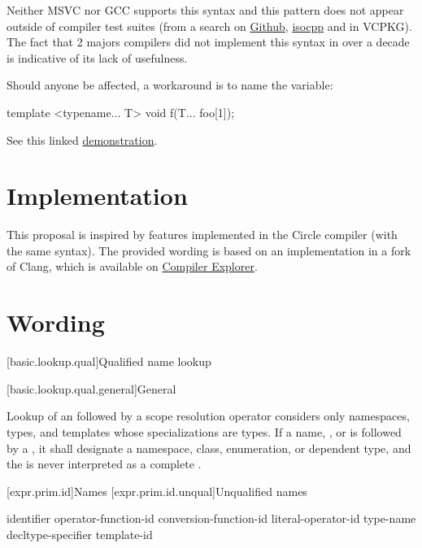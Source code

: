 \documentclass{wg21}
\begin{document}
Neither MSVC nor GCC supports this syntax and this pattern does not appear outside of compiler test suites (from a search on \href{https://cs.github.com/}{Github}, \href{https://codesearch.isocpp.org/cgi-bin/cgi_ppsearch?q=...%5B&search=Search}{isocpp} and in VCPKG).
The fact that 2 majors compilers did not implement this syntax in over a decade is indicative of its lack of usefulness.

Should anyone be affected, a workaround is to name the variable:

\begin{colorblock}
template <typename... T>
void f(T... foo[1]);
\end{colorblock}

See this linked \href{https://godbolt.org/z/T7v3ETz1G}{demonstration}.

\section{Implementation}

This proposal is inspired by features implemented in the Circle compiler (with the same syntax).
The provided wording is based on an implementation in a fork of Clang, which is available on \href{https://compiler-explorer.com/z/WKobTEq6x}{Compiler Explorer}.

\section{Wording}

[basic.lookup.qual]{Qualified name lookup}

[basic.lookup.qual.general]{General}

\pnum
{}%
%
%
Lookup of an 
followed by a \tcode{::} scope resolution operator
considers only
namespaces, types, and templates whose specializations are types.
If a name, ,  or 
is followed by a \tcode{::},
it shall designate a namespace, class, enumeration, or dependent type,
and the \tcode{::} is never interpreted as
a complete .

[expr.prim.id]{Names}
[expr.prim.id.unqual]{Unqualified names}

\begin{bnf}
    \br
    identifier\br
    \br
    operator-function-id\br
    conversion-function-id\br
    literal-operator-id\br
    \terminal{\~} type-name\br
    \terminal{\~} decltype-specifier\br
    \br
    template-id
\end{bnf}
\end{document}
